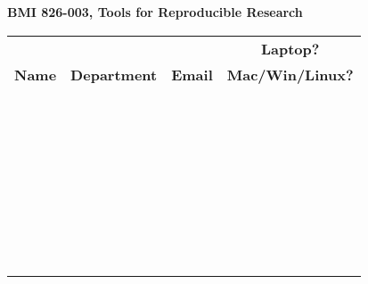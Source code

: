 \documentclass[12pt]{article}
\begin{document}
\begin{center}

\large
\textbf{BMI 826-003, Tools for Reproducible Research}

\bigskip

\begin{tabular}{|l|l|l|l|}
\hline
& & & \multicolumn{1}{|c|}{\textbf{Laptop?}} \\
\textbf{Name} & \textbf{Department} & \textbf{Email} &
\textbf{Mac/Win/Linux?}
\\ \hline \hline
\hspace{2.1in} & \hspace{0.9in} & \hspace{2.1in} & \hspace{1.0in}
\\ \hline
& & & \\ \hline
& & & \\ \hline
& & & \\ \hline
& & & \\ \hline  \hline
& & & \\ \hline
& & & \\ \hline
& & & \\ \hline
& & & \\ \hline
& & & \\ \hline \hline
& & & \\ \hline
& & & \\ \hline
& & & \\ \hline
& & & \\ \hline
& & & \\ \hline \hline
& & & \\ \hline
& & & \\ \hline
& & & \\ \hline
& & & \\ \hline
& & & \\ \hline \hline
& & & \\ \hline
& & & \\ \hline
& & & \\ \hline
& & & \\ \hline
& & & \\ \hline \hline
& & & \\ \hline
& & & \\ \hline
& & & \\ \hline
& & & \\ \hline
& & & \\ \hline \hline
& & & \\ \hline
& & & \\ \hline
& & & \\ \hline
& & & \\ \hline
& & & \\ \hline
\end{tabular} \end{center}
\end{document}
